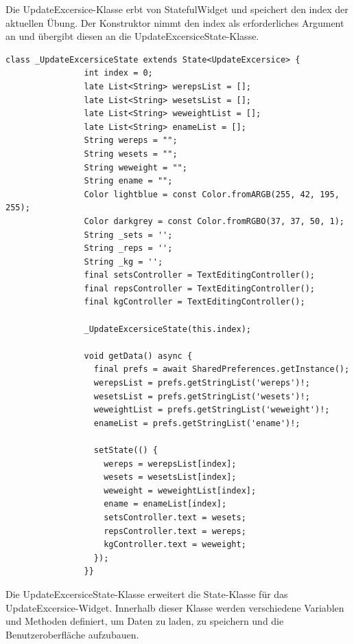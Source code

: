        Die UpdateExcersice-Klasse erbt von StatefulWidget und speichert den index der aktuellen Übung. Der Konstruktor nimmt den index als erforderliches Argument an und übergibt diesen an die UpdateExcersiceState-Klasse.
        \\
         

        \begin{lstlisting}[caption=Bearbeiten UpdateExcersiceState,label=lst:impl:frontend:qrcode]
              class _UpdateExcersiceState extends State<UpdateExcersice> {
                int index = 0;
                late List<String> werepsList = [];
                late List<String> wesetsList = [];
                late List<String> weweightList = [];
                late List<String> enameList = [];
                String wereps = "";
                String wesets = "";
                String weweight = "";
                String ename = "";
                Color lightblue = const Color.fromARGB(255, 42, 195, 255);
                Color darkgrey = const Color.fromRGBO(37, 37, 50, 1);
                String _sets = '';
                String _reps = '';
                String _kg = '';
                final setsController = TextEditingController();
                final repsController = TextEditingController();
                final kgController = TextEditingController();
              
                _UpdateExcersiceState(this.index);
              
                void getData() async {
                  final prefs = await SharedPreferences.getInstance();
                  werepsList = prefs.getStringList('wereps')!;
                  wesetsList = prefs.getStringList('wesets')!;
                  weweightList = prefs.getStringList('weweight')!;
                  enameList = prefs.getStringList('ename')!;
              
                  setState(() {
                    wereps = werepsList[index];
                    wesets = wesetsList[index];
                    weweight = weweightList[index];
                    ename = enameList[index];
                    setsController.text = wesets;
                    repsController.text = wereps;
                    kgController.text = weweight;
                  });
                }}
        \end{lstlisting}
        
        Die UpdateExcersiceState-Klasse erweitert die State-Klasse für das UpdateExcersice-Widget. Innerhalb dieser Klasse werden verschiedene Variablen und Methoden definiert, um Daten zu laden, zu speichern und die Benutzeroberfläche aufzubauen.
        \\
        

